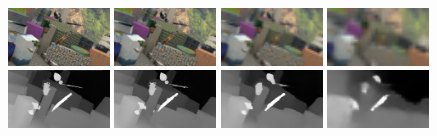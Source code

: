 \documentclass[runningheads]{llncs}
\begin{document}
\begin{figure}[!htbp]
    \begin{center}
        \includegraphics[width=0.24\textwidth,clip]{figures/imL_0.png}
        \includegraphics[width=0.24\textwidth,clip]{figures/imL_1.png}
        \includegraphics[width=0.24\textwidth,clip]{figures/imL_2.png}
        \includegraphics[width=0.24\textwidth,clip]{figures/imL_3.png}
        \\
        \includegraphics[width=0.24\textwidth,clip]{figures/pred_comb_0.png}
        \includegraphics[width=0.24\textwidth,clip]{figures/pred_comb_1.png}
        \includegraphics[width=0.24\textwidth,clip]{figures/pred_comb_2.png}
        \includegraphics[width=0.24\textwidth,clip]{figures/pred_comb_3.png}

\end{center}
\end{figure}
\end{document}
